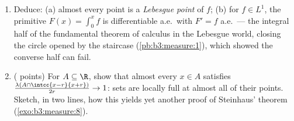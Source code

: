 \begin{problem}
\begin{enumerate}[resume]
{        $\norm h_1 < \varepsilon$
        (\cref{thm:b3:lp:density}); the set where
        $\limsup_{r\to0}$ of the averaged oscillation exceeds
        $\delta$ sits inside $\{Mh > \delta/2\} \cup \{\abs h
        > \delta/2\}$, of  $O(\varepsilon/\delta)$;
        let $\varepsilon \to 0$, then $\delta \to 0$ along a
        sequence.)}
  \item Deduce: (a) almost every point is a \emph{Lebesgue
        point} of $f$; (b) for $f \in L^1$, the primitive
        $F(x) = \int_0^xf$ is differentiable a.e.\ with $F' =
        f$ a.e.\ --- the integral half of the fundamental
        theorem of calculus in the Lebesgue world, closing
        the circle opened by the staircase
        (\cref{pb:b3:measure:1}), which showed the converse
        half can fail.
  \item ( points) For  $A \subseteq \R$,
        show that almost every $x \in A$ satisfies
        $\frac{\lambda(A\cap\intcc{x-r}{x+r})}{2r} \to 1$:
         sets are locally full at almost all of
        their points. Sketch, in two lines, how this yields
        yet another proof of Steinhaus' theorem
        (\cref{exo:b3:measure:8}).
\end{enumerate}


\end{problem}
